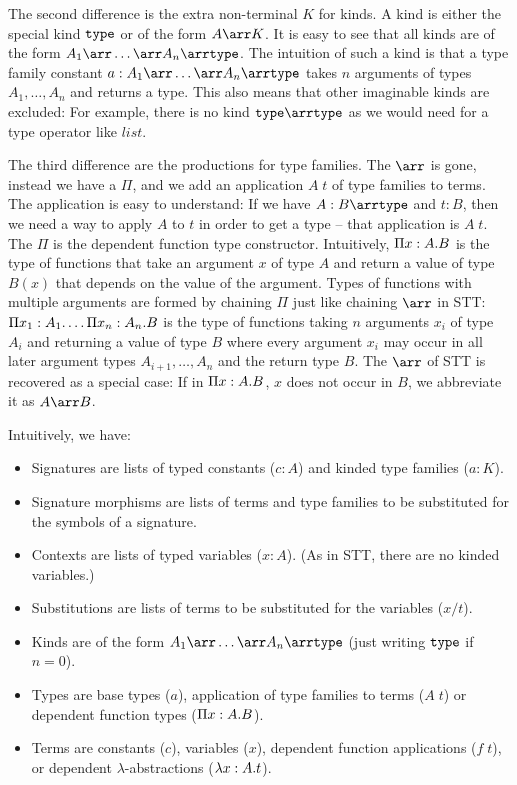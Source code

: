 The second difference is the extra non-terminal $K$ for kinds. A kind is either the special kind $\TYPE$ or of the form $A\arr K$. It is easy to see that all kinds are of the form $A_1\arr\ldots\arr A_n\arr\TYPE$. The intuition of such a kind is that a type family constant $a:A_1\arr\ldots\arr A_n\arr\TYPE$ takes $n$ arguments of types $A_1,\ldots,A_n$ and returns a type. This also means that other imaginable kinds are excluded: For example, there is no kind $\TYPE\arr\TYPE$ as we would need for a type operator like $list$.

The third difference are the productions for type families. The $\arr$ is gone, instead we have a $\Pi$, and we add an application $A\;t$ of type families to terms. The application is easy to understand: If we have $A:B\arr\TYPE$ and $t:B$, then we need a way to apply $A$ to $t$ in order to get a type -- that application is $A\;t$. The $\Pi$ is the dependent function type constructor. Intuitively, $\P{x}{A}B$ is the type of functions that take an argument $x$ of type $A$ and return a value of type $B(x)$ that depends on the value of the argument. Types of functions with multiple arguments are formed by chaining $\Pi$ just like chaining $\arr$ in STT: $\P{x_1}{A_1}\ldots\P{x_n}{A_n}B$ is the type of functions taking $n$ arguments $x_i$ of type $A_i$ and returning a value of type $B$ where every argument $x_i$ may occur in all later argument types $A_{i+1},\ldots,A_n$ and the return type $B$. The $\arr$ of STT is recovered as a special case: If in $\P{x}{A}B$, $x$ does not occur in $B$, we abbreviate it as $A\arr B$.

Intuitively, we have:
\begin{itemize}
	\item Signatures are lists of typed constants ($c:A$) and kinded type families ($a:K$).
	\item Signature morphisms are lists of terms and type families to be substituted for the symbols of a signature.
	\item Contexts are lists of typed variables ($x:A$). (As in STT, there are no kinded variables.)
	\item Substitutions are lists of terms to be substituted for the variables ($x/t$).
	\item Kinds are of the form $A_1\arr\ldots\arr A_n\arr\TYPE$ (just writing $\TYPE$ if $n=0$).
	\item Types are base types ($a$), application of type families to terms ($A\;t$) or dependent function types ($\P{x}{A}B$).
	\item Terms are constants ($c$), variables ($x$), dependent function applications ($f\;t$), or dependent $\lambda$-abstractions ($\lam{x}{A}t$).
\end{itemize}


